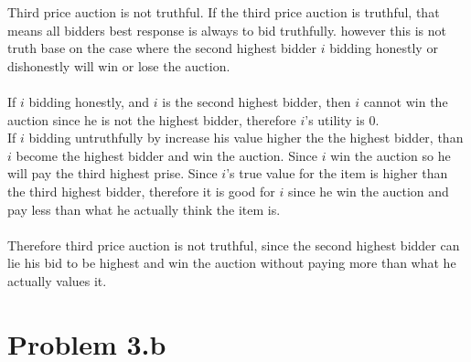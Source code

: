 \documentclass{article}
\begin{document}
Third price auction is not truthful.
If the third price auction is truthful, that means all bidders best response is always to bid truthfully. however this is not truth base on the case where the second highest bidder $i$ bidding honestly or dishonestly will win or lose the auction.\\\\
If $i$ bidding honestly, and $i$ is the second highest bidder, then $i$ cannot win the auction since he is not the highest bidder, therefore $i$'s utility is $0$.\\
If $i$ bidding untruthfully by increase his value higher the the highest bidder, than $i$ become the highest bidder and win the auction. Since $i$ win the auction so he will pay the third highest prise. Since $i$'s true value for the item is higher than the third highest bidder, therefore it is good for $i$ since he win the auction and pay less than what he actually think the item is.\\\\
Therefore third price auction is not truthful, since the second highest bidder can lie his bid to be highest and win the auction without paying more than what he actually values it.

\newpage
\section{Problem 3.b}
\end{document}
